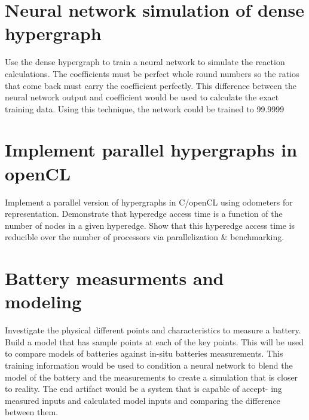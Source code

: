 \documentclass{article}
\begin{document}
\section{Neural network simulation of dense hypergraph}
Use the dense hypergraph to train a neural network to simulate the reaction calculations. The coefficients must be perfect whole round numbers so the ratios that come back must carry the coefficient perfectly. This difference between the neural network output and coefficient would be used to calculate the exact training data. Using this technique, the network could be trained to 99.9999%

\section{Implement parallel hypergraphs in openCL}
Implement a parallel version of hypergraphs in C/openCL using odometers for representation. Demonstrate that hyperedge access time is a function of the number of nodes in a given hyperedge. Show that this hyperedge access time is reducible over the number of processors via parallelization & benchmarking.

\section{Battery measurments and modeling}
Investigate the physical different points and characteristics to measure a battery. Build a model that has sample points at each of the key points. This will be used to compare models of batteries against in-situ batteries measurements. This training information would be used to condition a neural network to blend the model of the battery and the measurements to create a simulation that is closer to reality. The end artifact would be a system that is capable of accept- ing measured inputs and calculated model inputs and comparing the difference between them.
\end{document}
